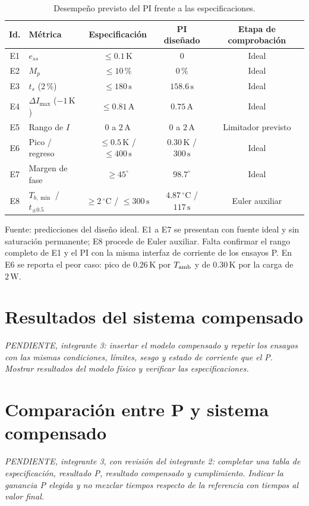 \documentclass[journal,twocolumn]{IEEEtran}
\begin{document}
\begin{table}[!htbp]\centering
\caption{Desempeño previsto del PI frente a las especificaciones.}\label{tab:prediccion}
{\footnotesize\setlength{\tabcolsep}{3pt}\renewcommand{\arraystretch}{1.15}
\begin{tabular}{clccc}\toprule
Id. & Métrica & Especificación & PI diseñado & Etapa de comprobación\\\midrule
E1 & $e_{ss}$ & $\le0.1\,\mathrm K$ & $0$ & Ideal\\
E2 & $M_p$ & $\le10\,\%$ & $0\,\%$ & Ideal\\
E3 & $t_s$ (2\,\%) & $\le180\,\mathrm s$ & $158.6\,\mathrm s$ & Ideal\\
E4 & $\Delta I_{\max}$ ($-1\,\mathrm K$) & $\le0.81\,\mathrm A$ & $0.75\,\mathrm A$ & Ideal\\
E5 & Rango de $I$ & $0$ a $2\,\mathrm A$ & $0$ a $2\,\mathrm A$ & Limitador previsto\\
E6 & Pico / regreso & $\le0.5\,\mathrm K$ / $\le400\,\mathrm s$ & $0.30\,\mathrm K$ / $300\,\mathrm s$ & Ideal\\
E7 & Margen de fase & $\ge45^\circ$ & $98.7^\circ$ & Ideal\\
E8 & $T_{b,\min}$ / $t_{\pm0.5}$ & $\ge2\,^\circ\mathrm C$ / $\le300\,\mathrm s$ & $4.87\,^\circ\mathrm C$ / $117\,\mathrm s$ & Euler auxiliar\\\bottomrule
\end{tabular}}
\par\smallskip\footnotesize Fuente: predicciones del diseño ideal. E1 a E7 se presentan con fuente ideal y sin saturación permanente; E8 procede de Euler auxiliar. Falta confirmar el rango completo de E1 y el PI con la misma interfaz de corriente de los ensayos P. En E6 se reporta el peor caso: pico de $0.26\,\mathrm K$ por $T_{\rm amb}$ y de $0.30\,\mathrm K$ por la carga de $2\,\mathrm W$.
\end{table}


\section{Resultados del sistema compensado}\label{sec:resultados}
\textit{PENDIENTE, integrante 3: insertar el modelo compensado y repetir los ensayos con las mismas condiciones, límites, sesgo y estado de corriente que el P. Mostrar resultados del modelo físico y verificar las especificaciones.}

\section{Comparación entre P y sistema compensado}\label{sec:comparacion}
\textit{PENDIENTE, integrante 3, con revisión del integrante 2: completar una tabla de especificación, resultado P, resultado compensado y cumplimiento. Indicar la ganancia P elegida y no mezclar tiempos respecto de la referencia con tiempos al valor final.}
\end{document}
